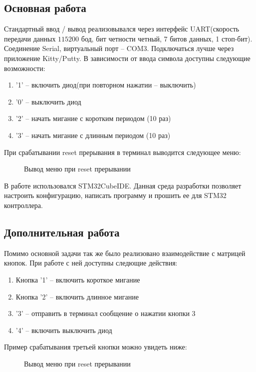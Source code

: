 \subsection{Основная работа}
Стандартный ввод / вывод реализовывался через интерфейс UART(скорость передачи данных $115200$ бод, бит четности четный,
7 битов данных, 1 стоп-бит). Соединение Serial, виртуальный порт -- COM3. Подключаться лучше через приложение Kitty/Putty.
В зависимости от ввода символа доступны следующие возможности:
\begin{enumerate}
\item '1' -- включить диод(при повторном нажатии -- выключить)
\item '0' -- выключить диод
\item '2' -- начать мигание с коротким периодом (10 раз)
\item '3' -- начать мигание с длинным периодом (10 раз)
\end{enumerate}

При срабатывании reset прерывания в терминал выводится следующее меню:
\begin{figure}[H]
    \centering
        \caption{Вывод меню при reset прерывании}
\end{figure}

В работе использовался STM32CubeIDE. Данная среда разработки позволяет настроить конфигурацию, написать программу и 
прошить ее для STM32 контроллера.

\subsection{Дополнительная работа}
Помимо основной задачи так же было реализовано взаимодействие с матрицей кнопок. При работе с ней доступны следющие действия:
\begin{enumerate}
    \item Кнопка '1' -- включить короткое мигание
    \item Кнопка '2' -- включить длинное мигание
    \item '3' -- отправить в терминал сообщение о нажатии кнопки 3
    \item '4' -- включить выключить диод
\end{enumerate}
Пример срабатывания третьей кнопки можно увидеть ниже:
\begin{figure}[H]
    \centering
        \caption{Вывод меню при reset прерывании}
\end{figure}


